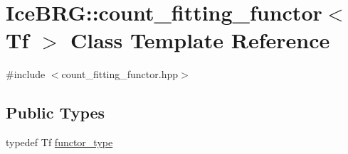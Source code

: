 \hypertarget{classIceBRG_1_1count__fitting__functor}{\section{Ice\-B\-R\-G\-:\-:count\-\_\-fitting\-\_\-functor$<$ Tf $>$ Class Template Reference}
\label{classIceBRG_1_1count__fitting__functor}
}


{\ttfamily \#include $<$count\-\_\-fitting\-\_\-functor.\-hpp$>$}

\subsection*{Public Types}
\begin{DoxyCompactItemize}
\item 
typedef Tf \hyperlink{classIceBRG_1_1count__fitting__functor_a681f2697a3ad0a5aa13882f0fba0e170}{functor\-\_\-type}
\end{DoxyCompactItemize}
